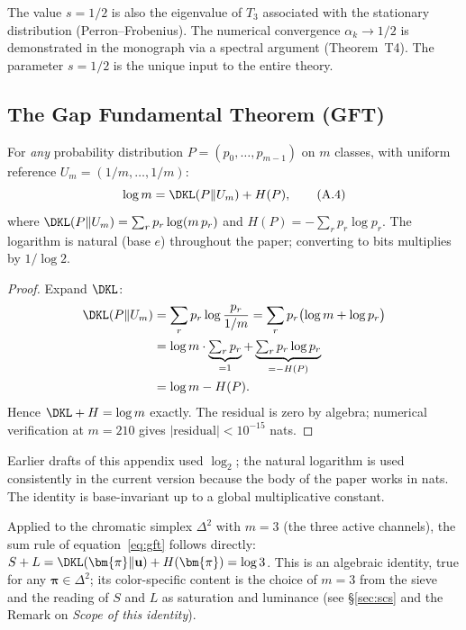\documentclass[12pt,a4paper]{article}
\begin{document}
\begin{remark}
The value $s = 1/2$ is also the eigenvalue of $T_3$ associated with
the stationary distribution (Perron--Frobenius). The numerical
convergence $\alpha_k \to 1/2$ is demonstrated in the monograph via a
spectral argument (Theorem~T4). The parameter $s = 1/2$ is the unique
input to the entire theory.
\end{remark}

\subsection{The Gap Fundamental Theorem (GFT)}
\label{app:gft}

\begin{identitybox}[Sum rule: $\DKL + H = \log m$]
For \emph{any} probability distribution
$P = (p_0, \ldots, p_{m-1})$ on $m$ classes, with uniform reference
$U_m = (1/m, \ldots, 1/m)$:
\begin{equation}
  \log m = \DKL(P \| U_m) + H(P),
  \tag{A.4}
\end{equation}
where $\DKL(P\|U_m) = \sum_r p_r \log(m\, p_r)$ and
$H(P) = -\sum_r p_r \log p_r$. The logarithm is natural (base $e$)
throughout the paper; converting to bits multiplies by $1/\log 2$.

\begin{proof}
Expand $\DKL$:
\begin{align*}
  \DKL(P\|U_m)
  &= \sum_r p_r \log\frac{p_r}{1/m}
   = \sum_r p_r \bigl(\log m + \log p_r\bigr) \\
  &= \log m \cdot \underbrace{\textstyle\sum_r p_r}_{=1}
   + \underbrace{\textstyle\sum_r p_r \log p_r}_{=-H(P)} \\
  &= \log m - H(P).
\end{align*}
Hence $\DKL + H = \log m$ exactly. The residual is zero by algebra;
numerical verification at $m = 210$ gives
$|\text{residual}| < 10^{-15}$ nats.
\end{proof}
\end{identitybox}

\begin{remark}
Earlier drafts of this appendix used $\log_2$; the natural logarithm
is used consistently in the current version because the body of the
paper works in nats. The identity is base-invariant up to a global
multiplicative constant.
\end{remark}

\begin{remark}
Applied to the chromatic simplex $\Delta^2$ with $m = 3$ (the three
active channels), the sum rule of equation~\eqref{eq:gft} follows
directly:
$S + L = \DKL(\bm{\pi}\|\mathbf{u}) + H(\bm{\pi}) = \log 3$. This is
an algebraic identity, true for any $\bm{\pi} \in \Delta^2$; its
color-specific content is the choice of $m = 3$ from the sieve and
the reading of $S$ and $L$ as saturation and luminance (see
\S\ref{sec:scs} and the Remark on \emph{Scope of this identity}).
\end{remark}
\end{document}
